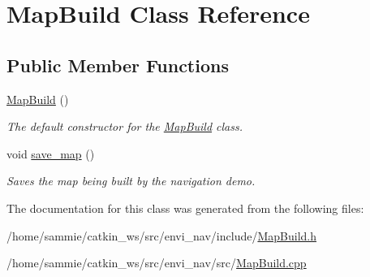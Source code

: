 \hypertarget{classMapBuild}{}\section{Map\+Build Class Reference}
\label{classMapBuild}
\subsection*{Public Member Functions}
\begin{DoxyCompactItemize}
\item 
\hyperlink{classMapBuild_a116a872478f708f37d45bb56f17d1549}{Map\+Build} ()\hypertarget{classMapBuild_a116a872478f708f37d45bb56f17d1549}{}\label{classMapBuild_a116a872478f708f37d45bb56f17d1549}

\begin{DoxyCompactList}\small\item\em The default constructor for the \hyperlink{classMapBuild}{Map\+Build} class. \end{DoxyCompactList}\item 
void \hyperlink{classMapBuild_a6f719b1f109486779ff0d60cc8d7ca45}{save\+\_\+map} ()\hypertarget{classMapBuild_a6f719b1f109486779ff0d60cc8d7ca45}{}\label{classMapBuild_a6f719b1f109486779ff0d60cc8d7ca45}

\begin{DoxyCompactList}\small\item\em Saves the map being built by the navigation demo. \end{DoxyCompactList}\end{DoxyCompactItemize}


The documentation for this class was generated from the following files\+:\begin{DoxyCompactItemize}
\item 
/home/sammie/catkin\+\_\+ws/src/envi\+\_\+nav/include/\hyperlink{MapBuild_8h}{Map\+Build.\+h}\item 
/home/sammie/catkin\+\_\+ws/src/envi\+\_\+nav/src/\hyperlink{MapBuild_8cpp}{Map\+Build.\+cpp}\end{DoxyCompactItemize}
